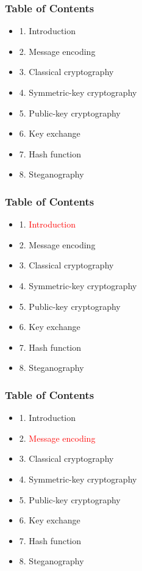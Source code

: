 \documentclass[handout, xcolor=dvipsnames,aspectratio=169]{beamer}
\begin{document}
\begin{frame}
  \centering
  \frametitle{Table of Contents}
  \begin{itemize}
    \item 1. Introduction
    \item 2. Message encoding
    \item 3. Classical cryptography
    \item 4. Symmetric-key cryptography
    \item 5. Public-key cryptography
    \item 6. Key exchange
    \item 7. Hash function
    \item 8. Steganography
  \end{itemize}  
\end{frame}
\begin{frame}
  \centering
  \frametitle{Table of Contents}
  \begin{itemize}
    \item 1. \textcolor{red}{Introduction}
    \item 2. Message encoding
    \item 3. Classical cryptography
    \item 4. Symmetric-key cryptography
    \item 5. Public-key cryptography
    \item 6. Key exchange
    \item 7. Hash function
    \item 8. Steganography
  \end{itemize}  
\end{frame}

\begin{frame}
  \centering
  \frametitle{Table of Contents}
  \begin{itemize}
    \item 1. Introduction
    \item 2. \textcolor{red}{Message encoding}
    \item 3. Classical cryptography
    \item 4. Symmetric-key cryptography
    \item 5. Public-key cryptography
    \item 6. Key exchange
    \item 7. Hash function
    \item 8. Steganography
  \end{itemize}  
\end{frame}
\end{document}
